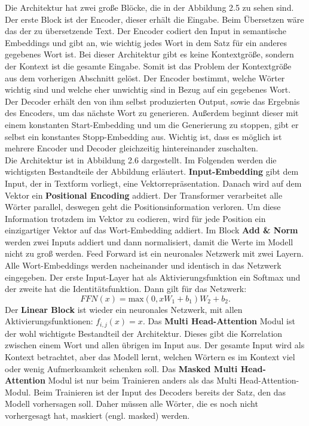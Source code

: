 \documentclass[12pt,letterpaper,ngerman]{article}
\begin{document}
Die Architektur hat zwei große Blöcke, die in der Abbildung 2.5
zu sehen sind. Der erste Block ist der Encoder, dieser erhält die
Eingabe. Beim Übersetzen wäre das der zu übersetzende Text.
Der Encoder codiert den Input in semantische Embeddings und gibt
an, wie wichtig jedes Wort in dem Satz für ein anderes gegebenes
Wort ist.
Bei dieser Architektur gibt es keine Kontextgröße, sondern der
Kontext ist die gesamte Eingabe. Somit ist das Problem der 
Kontextgröße aus dem vorherigen Abschnitt gelöst.
Der Encoder bestimmt, welche Wörter wichtig sind und welche eher 
unwichtig sind in Bezug auf ein gegebenes Wort.
Der Decoder erhält den von ihm selbst produzierten Output, sowie 
das Ergebnis des Encoders, um das nächste Wort zu generieren. 
Außerdem beginnt dieser mit einem konstanten Start-Embedding und 
um die Generierung zu stoppen, gibt er selbst ein konstantes 
Stopp-Embedding aus. Wichtig ist, dass es möglich ist mehrere
Encoder und Decoder gleichzeitig hintereinander zuschalten.\\
Die Architektur ist in Abbildung 2.6 dargestellt. Im Folgenden 
werden die wichtigsten Bestandteile der Abbildung erläutert.
{\bf Input-Embedding}
gibt dem Input, der in Textform vorliegt, eine Vektorrepräsentation.
Danach wird auf dem Vektor ein {\bf Positional Encoding}
addiert.
Der Transformer verarbeitet alle Wörter parallel, deswegen geht die 
Positionsinformation verloren. Um diese Information trotzdem im 
Vektor 
zu codieren, wird für jede Position ein einzigartiger Vektor auf
das Wort-Embedding addiert. 
Im Block {\bf Add \& Norm} werden zwei Inputs addiert und dann 
normalisiert, damit die Werte im Modell nicht zu groß werden.
Feed Forward ist ein neuronales Netzwerk mit zwei Layern.
Alle Wort-Embeddings werden nacheinander und identisch in das
Netzwerk eingegeben. Der erste Input-Layer hat als 
Aktivierungsfunktion ein 
Softmax und der zweite hat die Identitätsfunktion.
Dann gilt für das Netzwerk:
\[
  FFN(x) =\text{max}(0, xW_1 + b_1)W_2 + b_2.
\]
Der {\bf Linear Block} ist wieder ein neuronales Netzwerk, mit allen
Aktivierungsfunktionen: $ f_{i,j}(x) = x $. 
Das {\bf Multi Head-Attention} Modul ist der wohl wichtigste 
Bestandteil der Architektur. Dieses gibt die Korrelation 
zwischen einem Wort und allen
übrigen im Input aus. Der gesamte Input wird als Kontext 
betrachtet, aber das Modell lernt, welchen Wörtern es im 
Kontext viel oder wenig
Aufmerksamkeit schenken soll. Das {\bf Masked Multi Head-Attention}
Modul ist nur beim Trainieren anders als das Multi 
Head-Attention-Modul.
Beim Trainieren ist der Input des Decoders bereits der Satz,
den das Modell vorhersagen soll. Daher müssen alle Wörter, 
die es noch nicht vorhergesagt hat, maskiert (engl. masked) werden.
\end{document}
